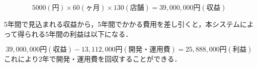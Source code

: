 \[5000(円)\times 60(ヶ月)\times 130(店舗)=39,000,000円(収益)\]


5年間で見込まれる収益から，5年間でかかる費用を差し引くと，本システムによって得られる5年間の利益は以下になる．

\[39,000,000円(収益)-13,112,000円(開発・運用費)=25,888,000円(利益)\]
これにより2年で開発・運用費を回収することができる．








